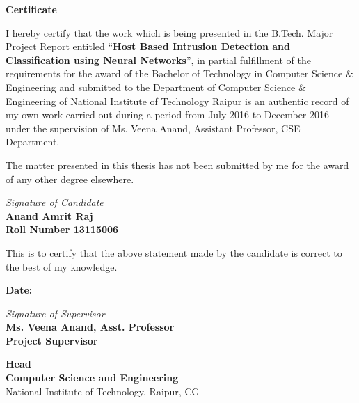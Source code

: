\documentclass[12pt]{article}
\newcommand{\projectTitle}{Host Based Intrusion Detection and Classification using Neural Networks}
\newcommand{\quotes}[1]{``#1''}
\theoremstyle{definition}
\begin{document}
	
	\begin{titlepage}
		
		\textbf{%
			\hfill
			\Large Certificate \hfill\hfill\\
		}
		\vspace{15pt}
		
		I hereby certify that the work which is being presented in the B.Tech. Major Project Report entitled \quotes{\textbf{\projectTitle}}, in partial fulfillment of the requirements for the award of the Bachelor  of Technology in Computer Science \& Engineering and submitted to the Department of Computer Science \& Engineering of National Institute of Technology Raipur  is an authentic record of my own work carried out during a period from July 2016 to December 2016 under the supervision of  Ms. Veena Anand, Assistant Professor, CSE Department. 

		The matter presented in this thesis has not been submitted by me for the award of any other degree elsewhere.\\
		[.25in]
		\begin{flushright}
			\textit{Signature of Candidate}\\
				\textbf{Anand Amrit Raj \\
				Roll Number 13115006\\}
		\end{flushright}
	\vspace{10pt}
	This is to certify that the above statement made by the candidate is correct to the best of my knowledge.

		\begin{flushleft}
			\textbf{Date:}
		\end{flushleft}
		\begin{flushright}
			\textit{Signature of Supervisor}\\
				\textbf{Ms. Veena Anand, Asst. Professor\\
				Project Supervisor\\}
		\end{flushright}
		\vspace{30pt}
		\begin{flushleft}
			\textbf{\large Head}\\
			\textbf{Computer Science and Engineering}\\
			National Institute of Technology, Raipur, CG
		\end{flushleft}
	\end{titlepage}
	
\end{document}
